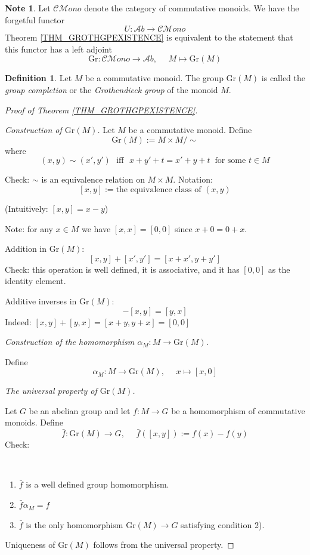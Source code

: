 \documentclass[12pt, letterpaper, oneside]{article}
\theoremstyle{plain}
\theoremstyle{definition}
\newtheorem{definition}[theorem]{Definition}
\newtheorem{note}[theorem]{Note}
\newcommand{\lra}{\longrightarrow}
\newcommand{\Ab}{{\mathcal Ab}}
\newcommand{\Gro}{\mathrm {Gr}}
\newcommand{\benu}{\begin{enumerate}}
\newcommand{\eenu}{\end{enumerate}}
\newcommand{\vs}{\vskip 5mm}
\begin{document}
\vs\vs

\begin{note}
Let ${\mathcal C}{\mathcal Mono}$ denote the category of commutative monoids. We have 
the forgetful functor 
$$U\colon \Ab \lra {\mathcal C}{\mathcal Mono}$$
Theorem \ref{THM_GROTHGPEXISTENCE} is equivalent to the statement that this functor 
has a left adjoint
$$\Gro\colon {\mathcal C}{\mathcal Mono} \to \Ab, \ \ \ \ \ \  M\mapsto \Gro(M)$$ 
\end{note}

\vs\vs

\begin{definition}
Let $M$ be a commutative monoid. The group $\Gro(M)$ is called the \emph{group completion}
or the \emph{Grothendieck group} of the monoid $M$.
\end{definition}


\vs\vs

\begin{proof}[Proof of Theorem \ref{THM_GROTHGPEXISTENCE}]\ 

\emph{Construction of $\Gro(M)$.}
Let $M$ be a commutative monoid. Define 
$$\Gro(M) := M\times M/\sim$$
where 
$$(x, y)\sim (x', y') \ \ \  \text{iff} \ \ \  x+y' + t =  x'+ y + t \ \text{ for some } t\in M $$

Check: $\sim$ is an equivalence relation on $M\times M$. Notation: 
$$[x, y] := \text{the equivalence class of } (x, y)$$

(Intuitively: $[x, y] = x-y$)

Note: for any $x\in M$ we have $[x, x] = [0, 0]$ since $x+0 = 0+x$.

\vs

Addition in $\Gro(M)$:
$$[x, y] + [x', y'] = [x+x', y+y']$$
Check: this operation is well defined,  it is associative, and it has $[0, 0]$ as the identity element. 

\vs

Additive inverses in $\Gro(M)$:
$$-[x, y] = [y, x]$$
Indeed: $[x, y] + [y, x] = [x+y, y+x] = [0, 0]$


\vs\vs

\emph{Construction of the homomorphism $\alpha_{M} \colon M \to \Gro(M)$.}

Define 
$$\alpha_{M}\colon M \to \Gro(M), \ \ \ \ \ \ x \mapsto [x, 0]$$

\vs\vs

\emph{The universal property of  $\Gro(M)$.}

Let $G$ be an abelian group and let $f\colon M \to G$ be a homomorphism of commutative 
monoids. Define 
$$\bar{f}\colon \Gro(M) \to G, \ \ \ \ \ \ \bar{f}([x, y]) := f(x) - f(y)$$
Check:

\vskip -13mm

\ 
\benu
\item $\bar{f}$ is a well defined group homomorphism. 
\item $\bar{f}\alpha_{M} = f$
\item $\bar{f}$ is the only homomorphism $\Gro(M)\to G$ satisfying condition 2).
\eenu


Uniqueness of $\Gro(M)$ follows from the universal property. 

\end{proof}
\end{document}
